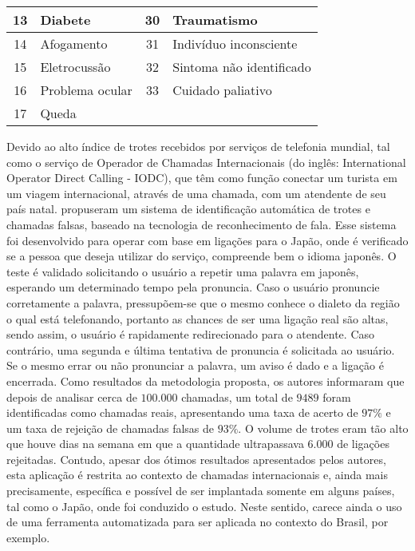 \begin{table}[ht!]
\begin{tabular}{@{}clcl@{}}
13 & Diabete                               & 30 & Traumatismo               \\ \midrule
14 & Afogamento                            & 31 & Indivíduo inconsciente    \\ \midrule
15 & Eletrocussão                          & 32 & Sintoma não identificado  \\ \midrule
16 & Problema ocular                       & 33 & Cuidado paliativo         \\ \midrule
17 & Queda                                 &    &                           \\ \bottomrule
\end{tabular}%
\end{table}

Devido ao alto índice de trotes recebidos por serviços de telefonia mundial, tal como o serviço de Operador de Chamadas Internacionais (do inglês: International Operator Direct Calling - IODC), que têm como função conectar um turista em um viagem internacional, através de uma chamada, com um atendente de seu país natal. \cite{kuroiwa2004automatic} propuseram um sistema de identificação automática de trotes e chamadas falsas, baseado na tecnologia de reconhecimento de fala. Esse sistema foi desenvolvido para operar com base em ligações para o Japão, onde é verificado se a pessoa que deseja utilizar do serviço, compreende bem o idioma japonês. O teste é validado solicitando o usuário a repetir uma palavra em japonês, esperando um determinado tempo pela pronuncia. Caso o usuário pronuncie corretamente a palavra, pressupõem-se que o mesmo conhece o dialeto da região o qual está telefonando, portanto as chances de ser uma ligação real são altas, sendo assim, o usuário é rapidamente redirecionado para o atendente. Caso contrário, uma segunda e última tentativa de pronuncia é solicitada ao usuário. Se o mesmo errar ou não pronunciar a palavra, um aviso é dado e a ligação é encerrada. Como resultados da metodologia proposta, os autores informaram que depois de analisar cerca de $100.000$ chamadas, um total de $9489$ foram identificadas como chamadas reais, apresentando uma taxa de acerto de $97\%$ e um taxa de rejeição de chamadas falsas de $93\%$. O volume de trotes eram tão alto que houve dias na semana em que a quantidade ultrapassava $6.000$ de ligações rejeitadas. Contudo, apesar dos ótimos resultados apresentados pelos autores, esta aplicação é restrita ao contexto de chamadas internacionais e, ainda mais precisamente, específica e possível de ser implantada somente em alguns países, tal como o Japão, onde foi conduzido o estudo. Neste sentido, carece ainda o uso de uma ferramenta automatizada para ser aplicada no contexto do Brasil, por exemplo.

